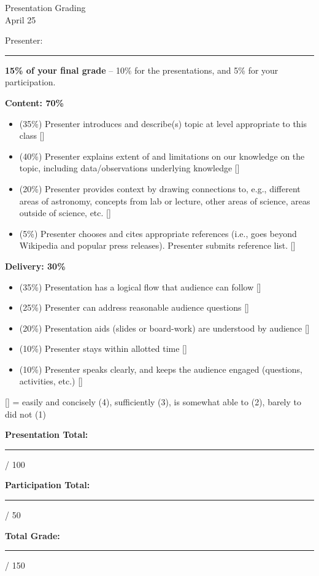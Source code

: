 \documentclass[11pt]{article}
\begin{document}
\begin{center}
\huge{Presentation Grading}\\ \medskip \Large{April 25}
\end{center}

\bigskip
\bigskip

\noindent
Presenter: \rule{10cm}{1pt}

\medskip \noindent
\textbf{15\% of your final grade} -- 10\% for the presentations, and 5\% for your participation.

\medskip \noindent
\textbf{Content: 70\%}
\begin{itemize}
    \item (35\%) Presenter introduces and describe(s) topic at level appropriate to this class [\underline{\hspace{5mm}}]
    \item (40\%) Presenter explains extent of and limitations on our knowledge on the topic, including data/observations underlying knowledge [\underline{\hspace{5mm}}]
    \item (20\%) Presenter provides context by drawing connections to, e.g., different areas of astronomy, concepts from lab or
    lecture, other areas of science, areas outside of science, etc. [\underline{\hspace{5mm}}]
    \item (5\%) Presenter chooses and cites appropriate references (i.e., goes beyond Wikipedia and popular press releases).  Presenter submits reference list. [\underline{\hspace{5mm}}]
\end{itemize} 

\noindent
\textbf{Delivery: 30\%}
\begin{itemize}
    \item (35\%) Presentation has a logical flow that audience can follow [\underline{\hspace{5mm}}]
    \item (25\%) Presenter can address reasonable audience questions [\underline{\hspace{5mm}}]
    \item (20\%) Presentation aids (slides or board-work) are understood by audience [\underline{\hspace{5mm}}]
    \item (10\%) Presenter stays within allotted time [\underline{\hspace{5mm}}]
    \item (10\%) Presenter speaks clearly, and keeps the audience engaged (questions, activities, etc.) [\underline{\hspace{5mm}}]
\end{itemize}
{\small [\underline{\hspace{5mm}}] = easily and concisely (4), sufficiently (3), is somewhat able to (2), barely to did not (1)}

\bigskip \noindent
\textbf{Presentation Total:} \rule{1cm}{1pt} / 100

\medskip \noindent
\textbf{Participation Total:} \rule{1cm}{1pt} / 50

\bigskip \bigskip \noindent
\textbf{Total Grade:} \rule{1cm}{1pt} / 150
\end{document}
